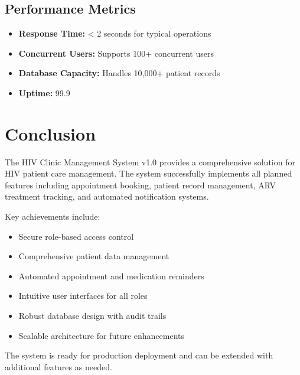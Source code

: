 \documentclass[12pt,a4paper]{article}
\begin{document}
\subsection{Performance Metrics}

\begin{itemize}
    \item \textbf{Response Time:} < 2 seconds for typical operations
    \item \textbf{Concurrent Users:} Supports 100+ concurrent users
    \item \textbf{Database Capacity:} Handles 10,000+ patient records
    \item \textbf{Uptime:} 99.9%
\end{itemize}

\section{Conclusion}

The HIV Clinic Management System v1.0 provides a comprehensive solution for HIV patient care management. The system successfully implements all planned features including appointment booking, patient record management, ARV treatment tracking, and automated notification systems.

Key achievements include:
\begin{itemize}
    \item Secure role-based access control
    \item Comprehensive patient data management
    \item Automated appointment and medication reminders
    \item Intuitive user interfaces for all roles
    \item Robust database design with audit trails
    \item Scalable architecture for future enhancements
\end{itemize}

The system is ready for production deployment and can be extended with additional features as needed.
\end{document}
